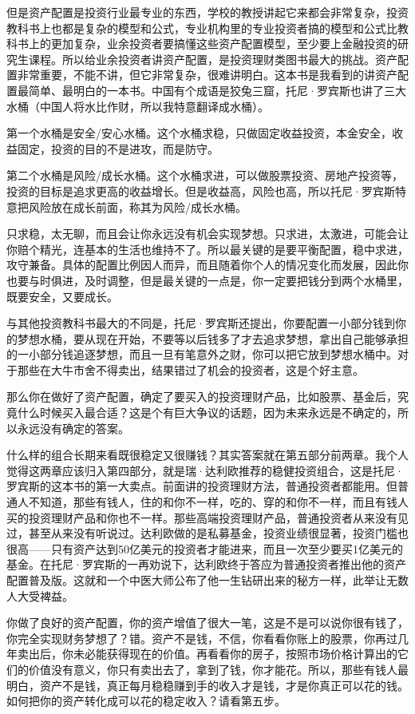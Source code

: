 但是资产配置是投资行业最专业的东西，学校的教授讲起它来都会非常复杂，投资教科书上也都是复杂的模型和公式，专业机构里的专业投资者搞的模型和公式比教科书上的更加复杂，业余投资者要搞懂这些资产配置模型，至少要上金融投资的研究生课程。所以给业余投资者讲资产配置，是投资理财类图书最大的挑战。资产配置非常重要，不能不讲，但它非常复杂，很难讲明白。这本书是我看到的讲资产配置最简单、最明白的一本书。中国有个成语是狡兔三窟，托尼·罗宾斯也讲了三大水桶（中国人将水比作财，所以我特意翻译成水桶）。

第一个水桶是安全/安心水桶。这个水桶求稳，只做固定收益投资，本金安全，收益固定，投资的目的不是进攻，而是防守。

第二个水桶是风险/成长水桶。这个水桶求进，可以做股票投资、房地产投资等，投资的目标是追求更高的收益增长。但是收益高，风险也高，所以托尼·罗宾斯特意把风险放在成长前面，称其为风险/成长水桶。

只求稳，太无聊，而且会让你永远没有机会实现梦想。只求进，太激进，可能会让你赔个精光，连基本的生活也维持不了。所以最关键的是要平衡配置，稳中求进，攻守兼备。具体的配置比例因人而异，而且随着你个人的情况变化而发展，因此你也要与时俱进，及时调整，但是最关键的一点是，你一定要把钱分到两个水桶里，既要安全，又要成长。

与其他投资教科书最大的不同是，托尼·罗宾斯还提出，你要配置一小部分钱到你的梦想水桶，要从现在开始，不要等以后钱多了才去追求梦想，拿出自己能够承担的一小部分钱追逐梦想，而且一旦有笔意外之财，你可以把它放到梦想水桶中。对于那些在大牛市舍不得卖出，结果错过了机会的投资者，这是个好主意。

那么你在做好了资产配置，确定了要买入的投资理财产品，比如股票、基金后，究竟什么时候买入最合适？这是个有巨大争议的话题，因为未来永远是不确定的，所以永远没有确定的答案。

什么样的组合长期来看既很稳定又很赚钱？其实答案就在第五部分前两章。我个人觉得这两章应该归入第四部分，就是瑞·达利欧推荐的稳健投资组合，这是托尼·罗宾斯的这本书的第一大卖点。前面讲的投资理财方法，普通投资者都能用。但普通人不知道，那些有钱人，住的和你不一样，吃的、穿的和你不一样，而且有钱人买的投资理财产品和你也不一样。那些高端投资理财产品，普通投资者从来没有见过，甚至从来没有听说过。达利欧做的是私募基金，投资业绩很显著，投资门槛也很高——只有资产达到50亿美元的投资者才能进来，而且一次至少要买1亿美元的基金。在托尼·罗宾斯的一再劝说下，达利欧终于答应为普通投资者推出他的资产配置普及版。这就和一个中医大师公布了他一生钻研出来的秘方一样，此举让无数人大受裨益。

你做了良好的资产配置，你的资产增值了很大一笔，这是不是可以说你很有钱了，你完全实现财务梦想了？错。资产不是钱，不信，你看看你账上的股票，你再过几年卖出后，你未必能获得现在的价值。再看看你的房子，按照市场价格计算出的它们的价值没有意义，你只有卖出去了，拿到了钱，你才能花。所以，那些有钱人最明白，资产不是钱，真正每月稳稳赚到手的收入才是钱，才是你真正可以花的钱。如何把你的资产转化成可以花的稳定收入？请看第五步。


